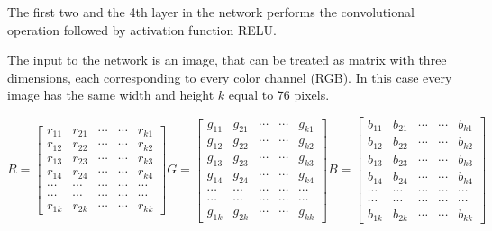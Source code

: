 The first two and the 4th layer in the network performs the convolutional operation followed by activation function RELU.

The input to the network is an image, that can be treated as matrix with three dimensions, each corresponding to every color channel (RGB). In this case every image has the same width and height $k$ equal to 76 pixels. 

\begin{equation}
R =
\left[
\begin{matrix}
r_{11} & r_{21} & \cdots & \cdots & r_{k1}\\
r_{12} & r_{22} & \cdots & \cdots & r_{k2}\\
r_{13} & r_{23} & \cdots & \cdots & r_{k3}\\
r_{14} & r_{24} & \cdots & \cdots & r_{k4}\\
\cdots & \cdots & \cdots & \cdots & \cdots\\
\cdots & \cdots & \cdots & \cdots & \cdots\\
r_{1k} & r_{2k} & \cdots & \cdots & r_{kk}
\end{matrix}
\right]
G =
\left[
\begin{matrix}
g_{11} & g_{21} & \cdots & \cdots & g_{k1}\\
g_{12} & g_{22} & \cdots & \cdots & g_{k2}\\
g_{13} & g_{23} & \cdots & \cdots & g_{k3}\\
g_{14} & g_{24} & \cdots & \cdots & g_{k4}\\
\cdots & \cdots & \cdots & \cdots & \cdots\\
\cdots & \cdots & \cdots & \cdots & \cdots\\
g_{1k} & g_{2k} & \cdots & \cdots & g_{kk}
\end{matrix}
\right]
B =
\left[
\begin{matrix}
b_{11} & b_{21} & \cdots & \cdots & b_{k1}\\
b_{12} & b_{22} & \cdots & \cdots & b_{k2}\\
b_{13} & b_{23} & \cdots & \cdots & b_{k3}\\
b_{14} & b_{24} & \cdots & \cdots & b_{k4}\\
\cdots & \cdots & \cdots & \cdots & \cdots\\
\cdots & \cdots & \cdots & \cdots & \cdots\\
b_{1k} & b_{2k} & \cdots & \cdots & b_{kk}
\end{matrix}
\right]
\end{equation}

